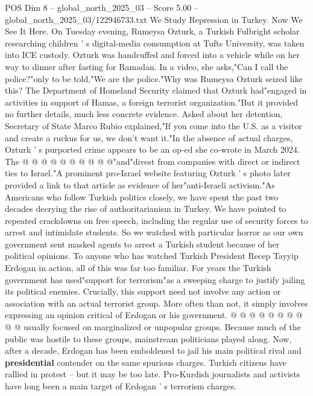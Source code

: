 \begin{textsample}{POS Dim 8 – global\_north\_2025\_03 – Score 5.00 – global\_north\_2025\_03/122946733.txt}  \label{ex:f8_pos_337}
We Study Repression in Turkey.
Now We See It Here.
On Tuesday evening, Rumeysa Ozturk, a Turkish Fulbright scholar researching children ' s digital-media consumption at Tufts University, was taken into ICE custody.
Ozturk was handcuffed and forced into a vehicle while on her way to dinner after fasting for Ramadan.
In a video, she asks,"Can I call the police?"only to be told,"We are the police."Why was Rumeysa Ozturk seized like this?
The Department of Homeland Security claimed that Ozturk had"engaged in activities in support of Hamas, a foreign terrorist organization."But it provided no further details, much less concrete evidence.
Asked about her detention, Secretary of State Marco Rubio explained,"If you come into the U.S. as a visitor and create a ruckus for us, we don't want it."In the absence of actual charges, Ozturk ' s purported crime appears to be an op-ed she co-wrote in March 2024.
The @ @ @ @ @ @ @ @ @ @"and"divest from companies with direct or indirect ties to Israel."A prominent pro-Israel website featuring Ozturk ' s photo later provided a link to that article as evidence of her"anti-Israeli activism."As Americans who follow Turkish politics closely, we have spent the past two decades decrying the rise of authoritarianism in Turkey.
We have pointed to repeated crackdowns on free speech, including the regular use of security forces to arrest and intimidate students.
So we watched with particular horror as our own government sent masked agents to arrest a Turkish student because of her political opinions.
To anyone who has watched Turkish President Recep Tayyip Erdogan in action, all of this was far too familiar.
For years the Turkish government has used"support for terrorism"as a sweeping charge to justify jailing its political enemies.
Crucially, this support need not involve any action or association with an actual terrorist group.
More often than not, it simply involves expressing an opinion critical of Erdogan or his government. @ @ @ @ @ @ @ @ @ @ usually focused on marginalized or unpopular groups.
Because much of the public was hostile to these groups, mainstream politicians played along.
Now, after a decade, Erdogan has been emboldened to jail his main political rival and \textbf{presidential} contender on the same spurious charges.
Turkish citizens have rallied in protest -- but it may be too late.
Pro-Kurdish journalists and activists have long been a main target of Erdogan ' s terrorism charges.

\end{textsample}
